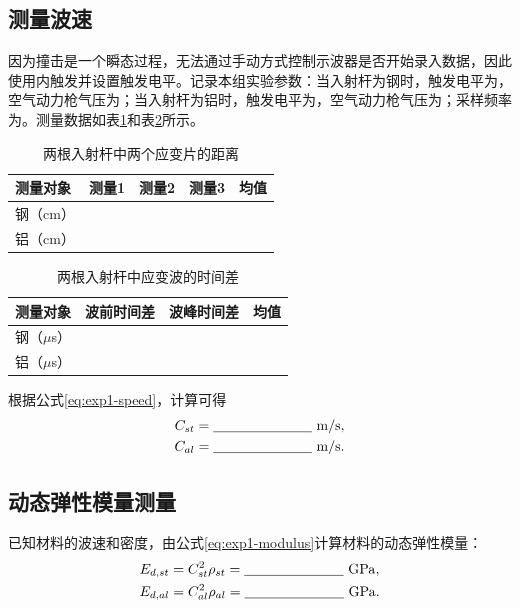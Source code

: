 \documentclass[UTF8,a4paper,12pt]{ctexart}
\newcommand{\blank}[1][2.5cm]{\mbox{\underline{\hspace{#1}}}}
\numberwithin{equation}{section}
\begin{document}
\subsection{测量波速}
因为撞击是一个瞬态过程，无法通过手动方式控制示波器是否开始录入数据，因此使用内触发并设置触发电平。记录本组实验参数：当入射杆为钢时，触发电平为\blank[2cm]，空气动力枪气压为\blank[2cm]；当入射杆为铝时，触发电平为\blank[2cm]，空气动力枪气压为\blank[2cm]；采样频率为\blank[2cm]。测量数据如表\ref{tab:exp1-distance}和表\ref{tab:exp1-time}所示。

\begin{table}[H]
\centering
\caption{两根入射杆中两个应变片的距离}
\label{tab:exp1-distance}
\begin{tabular}{lcccc}
\toprule
测量对象 & 测量1 & 测量2 & 测量3 & 均值\\
\midrule
钢（cm） & \blank[1.5cm] & \blank[1.5cm] & \blank[1.5cm] & \blank[1.5cm]\\
铝（cm） & \blank[1.5cm] & \blank[1.5cm] & \blank[1.5cm] & \blank[1.5cm]\\
\bottomrule
\end{tabular}
\end{table}

\begin{table}[H]
\centering
\caption{两根入射杆中应变波的时间差}
\label{tab:exp1-time}
\begin{tabular}{lccc}
\toprule
测量对象 & 波前时间差 & 波峰时间差 & 均值\\
\midrule
钢（$\mu$s） & \blank[1.8cm] & \blank[1.8cm] & \blank[1.8cm]\\
铝（$\mu$s） & \blank[1.8cm] & \blank[1.8cm] & \blank[1.8cm]\\
\bottomrule
\end{tabular}
\end{table}

根据公式\eqref{eq:exp1-speed}，计算可得
\begin{subequations}
\begin{align}
  C_{st}&=\blank[2.5cm]\ \mathrm{m/s},\\
  C_{al}&=\blank[2.5cm]\ \mathrm{m/s}.
\end{align}
\end{subequations}

\subsection{动态弹性模量测量}
已知材料的波速和密度，由公式\eqref{eq:exp1-modulus}计算材料的动态弹性模量：
\begin{subequations}
\begin{align}
  E_{d,st}&=C_{st}^2\rho_{st}=\blank[2.5cm]\ \mathrm{GPa},\\
  E_{d,al}&=C_{al}^2\rho_{al}=\blank[2.5cm]\ \mathrm{GPa}.
\end{align}
\end{subequations}
\end{document}
